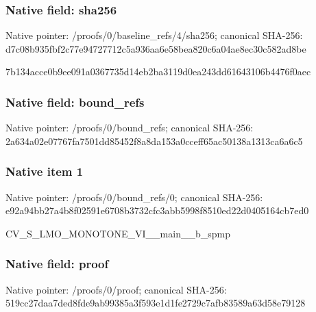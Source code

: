 \documentclass[10pt,a4paper]{article}
\begin{document}
\subsubsection{Native field: sha256}
Native pointer: /proofs/0/baseline\_\allowbreak{}refs/4/sha256; canonical SHA-256: d7c08b935fbf2c77e94727712c5a936aa6e58bea820c6a04ae8ec30c582ad8be

\begingroup\raggedright\sloppy 7b134acce0b9ee091a0367735d14eb2ba3119d0ea243dd61643106b4476f0aec\par\endgroup

\subsubsection{Native field: bound\_\allowbreak{}refs}
Native pointer: /proofs/0/bound\_\allowbreak{}refs; canonical SHA-256: 2a634a02e07767fa7501dd85452f8a8da153a0cceff65ac50138a1313ca6a6c5

\subsubsection{Native item 1}
Native pointer: /proofs/0/bound\_\allowbreak{}refs/0; canonical SHA-256: e92a94bb27a4b8f02591e6708b3732cfc3abb5998f8510ed22d0405164cb7ed0

\begingroup\raggedright\sloppy CV\_\allowbreak{}S\_\allowbreak{}LMO\_\allowbreak{}MONOTONE\_\allowbreak{}VI\_\allowbreak{}\_\allowbreak{}main\_\allowbreak{}\_\allowbreak{}b\_\allowbreak{}spmp\par\endgroup

\subsubsection{Native field: proof}
Native pointer: /proofs/0/proof; canonical SHA-256: 519cc27daa7ded8fde9ab99385a3f593e1d1fe2729c7afb83589a63d58e79128
\end{document}
